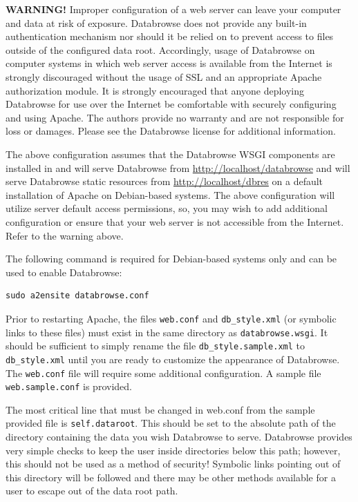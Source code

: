 \documentclass[10pt]{article}
\begin{document}
\textbf{WARNING!}  Improper configuration of a web server can leave your computer and data at risk of exposure.  Databrowse does not provide any built-in authentication mechanism nor should it be relied on to prevent access to files outside of the configured data root.  Accordingly, usage of Databrowse on computer systems in which web server access is available from the Internet is strongly discouraged without the usage of SSL and an appropriate Apache authorization module.  It is strongly encouraged that anyone deploying Databrowse for use over the Internet be comfortable with securely configuring and using Apache.  The authors provide no warranty and are not responsible for loss or damages.  Please see the Databrowse license for additional information.

The above configuration assumes that the Databrowse WSGI components are installed in  and will serve Databrowse from \url{http://localhost/databrowse} and will serve Databrowse static resources from \url{http://localhost/dbres} on a default installation of Apache on Debian-based systems.  The above configuration will utilize server default access permissions, so, you may wish to add additional configuration or ensure that your web server is not accessible from the Internet.  Refer to the warning above.

The following command is required for Debian-based systems only and can be used to enable Databrowse:

\begin{verbatim}
sudo a2ensite databrowse.conf
\end{verbatim}

Prior to restarting Apache, the files \texttt{web.conf} and \texttt{db\_style.xml} (or symbolic links to these files) must exist in the same directory as \texttt{databrowse.wsgi}.  It should be sufficient to simply rename the file \texttt{db\_style.sample.xml} to \texttt{db\_style.xml} until you are ready to customize the appearance of Databrowse.  The \texttt{web.conf} file will require some additional configuration.  A sample file \texttt{web.sample.conf} is provided.

The most critical line that must be changed in web.conf from the sample provided file is \texttt{self.dataroot}.  This should be set to the absolute path of the directory containing the data you wish Databrowse to serve.  Databrowse provides very simple checks to keep the user inside directories below this path; however, this should not be used as a method of security!  Symbolic links pointing out of this directory will be followed and there may be other methods available for a user to escape out of the data root path.
\end{document}
